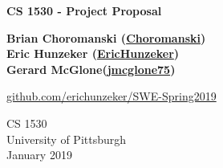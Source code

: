 \documentclass{article}
\begin{document}
\begin{titlepage}
    \begin{center}
        \vspace*{1cm}
        
        \LARGE
        \textbf{CS 1530 - Project Proposal}
        
        \vspace{1.5cm}
        
        \textbf{Brian Choromanski (\href{https://github.com/Choromanski}{\faGithub \space Choromanski})\\Eric Hunzeker (\href{https://github.com/erichunzeker}{\faGithub \space EricHunzeker})\\Gerard McGlone(\href{https://github.com/jmcglone75}{\faGithub \space jmcglone75})}
        
        \vfill
        
        \href{https://github.com/erichunzeker/SWE-Spring2019}{\faGithub \space github.com/erichunzeker/SWE-Spring2019}
        
        \vspace{0.8cm}
        
        \normalsize
        CS 1530\\
        University of Pittsburgh\\
        January 2019
        
    \end{center}
\end{titlepage}

\newpage

\newpage

\end{document}
